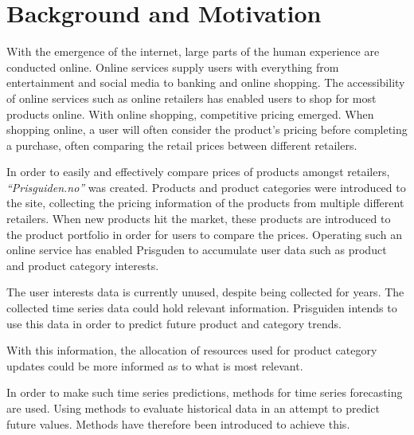 \section{Background and Motivation}\label{cit}
\label{section:Introduction:BackgroundAndMotivation}

With the emergence of the internet, large parts of the human experience are conducted online.
Online services supply users with everything from entertainment and social media to banking and online shopping.
The accessibility of online services such as online retailers has enabled users to shop for most products online.
With online shopping, competitive pricing emerged.
When shopping online, a user will often consider the product's pricing before completing a purchase, often comparing the retail prices between different retailers.


In order to easily and effectively compare prices of products amongst retailers,
\textit{``Prisguiden.no''} was created.
Products and product categories were introduced to the site, collecting the pricing information of the products from multiple different retailers.
When new products hit the market, these products are introduced to the product portfolio in order for users to compare the prices.
Operating such an online service has enabled Prisguden to accumulate user data such as product and product category interests.

The user interests data is currently unused, despite being collected for years.
The collected time series data could hold relevant information.
Prisguiden intends to use this data in order to predict future product and category trends.

With this information, the allocation of resources used for product category updates could be more informed
as to what is most relevant.



In order to make such time series predictions, methods for time series forecasting are used.
Using methods to evaluate historical data in an attempt to predict future values.
Methods have therefore been introduced to achieve this.


